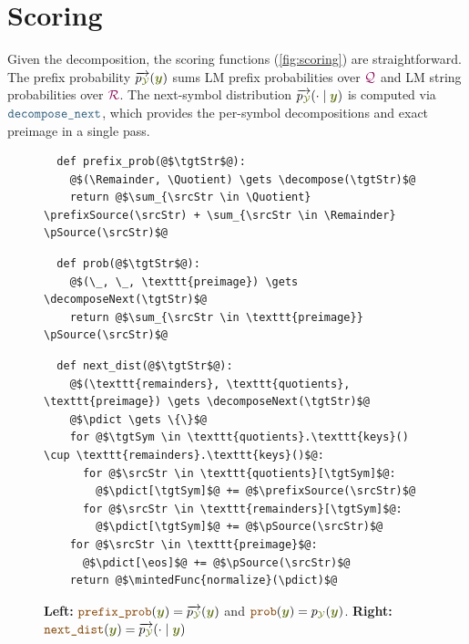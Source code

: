 \documentclass{article}
\theoremstyle{plain}
\newcommand{\mymacro}[1]{#1}
\newcommand{\Quotient}{{\color{TokenColor}\mathcal{Q}}}
\newcommand{\Remainder}{{\color{TokenColor}\mathcal{R}}}
\newcommand{\eos}{{\mymacro{\textsc{eos}}}}
\newcommand{\srcStr}{\ensuremath{{\color{TokenColor}\boldsymbol{x}}}\xspace}
\newcommand{\tgtSym}{{\color{CharacterColor}y}}
\newcommand{\tgtStr}{{\color{CharacterColor}\boldsymbol{y}}}
\newcommand{\pSource}{\mymacro{p_{\srcAlphabet}}}
\newcommand{\pTarget}{\mymacro{p_{\tgtAlphabet}}}
\newcommand{\prefixLanguageOp}[1]{\overrightarrow{#1}}
\newcommand{\prefixSource}{{\mymacro{\prefixLanguageOp{\pSource}}}}
\newcommand{\prefixTarget}{{\mymacro{\prefixLanguageOp{\pTarget}}}}
\newcommand{\srcAlphabet}[0]{{\color{TokenColor}\ensuremath{\mathcal{X}}}\xspace}
\newcommand{\tgtAlphabet}[0]{{\color{CharacterColor}\ensuremath{\mathcal{Y}}}\xspace}
\newcommand{\mintedFunc}[1]{\mbox{\texttt{{\color{orange!50!black}#1}}}}
\newcommand{\myMintedFunc}[1]{\mbox{\texttt{{\color{StormBlue}#1}}}}
\newcommand{\decompose}[0]{\myMintedFunc{decompose}}
\newcommand{\decomposeNext}[0]{\myMintedFunc{decompose\_next}}
\newcommand{\pdict}{\mymacro{\overline{p}}}
\begin{document}
\section{Scoring}
\label{sec:scoring}

Given the decomposition, the scoring functions (\cref{fig:scoring}) are
straightforward.
The prefix probability $\prefixTarget(\tgtStr)$ sums LM prefix probabilities
over $\Quotient$ and LM string probabilities over $\Remainder$.
The next-symbol distribution $\prefixTarget(\cdot \mid \tgtStr)$ is computed
via $\decomposeNext$, which provides the per-symbol decompositions and exact
preimage in a single pass.

\begin{figure}[H]
\centering
\begin{minipage}[t]{.48\linewidth}
\begin{verbatim}
  def prefix_prob(@$\tgtStr$@):
    @$(\Remainder, \Quotient) \gets \decompose(\tgtStr)$@
    return @$\sum_{\srcStr \in \Quotient} \prefixSource(\srcStr) + \sum_{\srcStr \in \Remainder} \pSource(\srcStr)$@
\end{verbatim}
\begin{verbatim}
  def prob(@$\tgtStr$@):
    @$(\_, \_, \texttt{preimage}) \gets \decomposeNext(\tgtStr)$@
    return @$\sum_{\srcStr \in \texttt{preimage}} \pSource(\srcStr)$@
\end{verbatim}
\end{minipage}
\hfill
\begin{minipage}[t]{.48\linewidth}
\begin{verbatim}
  def next_dist(@$\tgtStr$@):
    @$(\texttt{remainders}, \texttt{quotients}, \texttt{preimage}) \gets \decomposeNext(\tgtStr)$@
    @$\pdict \gets \{\}$@
    for @$\tgtSym \in \texttt{quotients}.\texttt{keys}() \cup \texttt{remainders}.\texttt{keys}()$@:
      for @$\srcStr \in \texttt{quotients}[\tgtSym]$@:
        @$\pdict[\tgtSym]$@ += @$\prefixSource(\srcStr)$@
      for @$\srcStr \in \texttt{remainders}[\tgtSym]$@:
        @$\pdict[\tgtSym]$@ += @$\pSource(\srcStr)$@
    for @$\srcStr \in \texttt{preimage}$@:
      @$\pdict[\eos]$@ += @$\pSource(\srcStr)$@
    return @$\mintedFunc{normalize}(\pdict)$@
\end{verbatim}
\end{minipage}
\caption[Scoring functions]{%
\textbf{Left:} $\mintedFunc{prefix\_prob}(\tgtStr) = \prefixTarget(\tgtStr)$ and
$\mintedFunc{prob}(\tgtStr) = \pTarget(\tgtStr)$.
\textbf{Right:} $\mintedFunc{next\_dist}(\tgtStr) = \prefixTarget(\cdot \mid \tgtStr)$
}
\end{figure}
\end{document}
